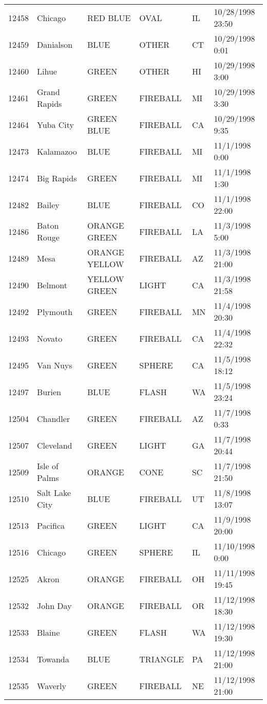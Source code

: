\begin{tabular}{llllll}
12458 & Chicago & RED BLUE & OVAL & IL & 10/28/1998 23:50 \\
12459 & Danialson & BLUE & OTHER & CT & 10/29/1998 0:01 \\
12460 & Lihue & GREEN & OTHER & HI & 10/29/1998 3:00 \\
12461 & Grand Rapids & GREEN & FIREBALL & MI & 10/29/1998 3:30 \\
12464 & Yuba City & GREEN BLUE & FIREBALL & CA & 10/29/1998 9:35 \\
12473 & Kalamazoo & BLUE & FIREBALL & MI & 11/1/1998 0:00 \\
12474 & Big Rapids & GREEN & FIREBALL & MI & 11/1/1998 1:30 \\
12482 & Bailey & BLUE & FIREBALL & CO & 11/1/1998 22:00 \\
12486 & Baton Rouge & ORANGE GREEN & FIREBALL & LA & 11/3/1998 5:00 \\
12489 & Mesa & ORANGE YELLOW & FIREBALL & AZ & 11/3/1998 21:00 \\
12490 & Belmont & YELLOW GREEN & LIGHT & CA & 11/3/1998 21:58 \\
12492 & Plymouth & GREEN & FIREBALL & MN & 11/4/1998 20:30 \\
12493 & Novato & GREEN & FIREBALL & CA & 11/4/1998 22:32 \\
12495 & Van Nuys & GREEN & SPHERE & CA & 11/5/1998 18:12 \\
12497 & Burien & BLUE & FLASH & WA & 11/5/1998 23:24 \\
12504 & Chandler & GREEN & FIREBALL & AZ & 11/7/1998 0:33 \\
12507 & Cleveland & GREEN & LIGHT & GA & 11/7/1998 20:44 \\
12509 & Isle of Palms & ORANGE & CONE & SC & 11/7/1998 21:50 \\
12510 & Salt Lake City & BLUE & FIREBALL & UT & 11/8/1998 13:07 \\
12513 & Pacifica & GREEN & LIGHT & CA & 11/9/1998 20:00 \\
12516 & Chicago & GREEN & SPHERE & IL & 11/10/1998 0:00 \\
12525 & Akron & ORANGE & FIREBALL & OH & 11/11/1998 19:45 \\
12532 & John Day & ORANGE & FIREBALL & OR & 11/12/1998 18:30 \\
12533 & Blaine & GREEN & FLASH & WA & 11/12/1998 19:30 \\
12534 & Towanda & BLUE & TRIANGLE & PA & 11/12/1998 21:00 \\
12535 & Waverly & GREEN & FIREBALL & NE & 11/12/1998 21:00 \\

\end{tabular}
